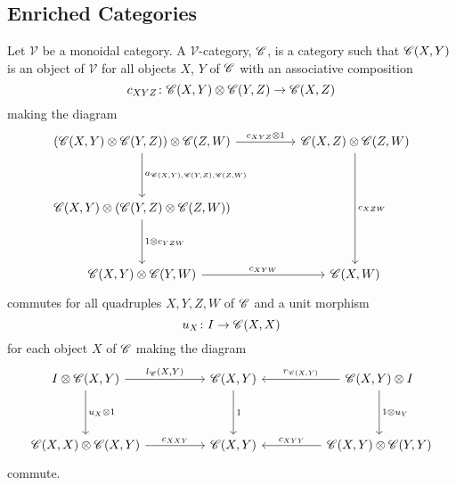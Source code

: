 \documentclass[dissertation.tex]{subfiles}
\begin{document}
\subsection{Enriched Categories}
\begin{defn}
  Let $\mathscr{V}$ be a monoidal category.
  A $\mathscr{V}$-category, $\mathscr{C}$, is a category such that $\mathscr{C}(X,Y)$ is an object of $\mathscr{V}$ for all objects $X$, $Y$ of $\mathscr{C}$ with an associative composition 
  $$c_{XYZ} \colon \mathscr{C}(X,Y) \otimes \mathscr{C}(Y,Z) \to \mathscr{C}(X,Z)$$
  making the diagram
  $$\begin{tikzcd}
    \left(\CC(X,Y) \otimes \CC(Y,Z)\right) \otimes \CC(Z,W)\arrow{rr}{c_{XYZ} \otimes 1}\arrow{dd}{a_{\CC(X,Y),\CC(Y,Z),\CC(Z,W)}} && \CC(X,Z) \otimes \CC(Z,W)\arrow{dddd}{c_{XZW}}\\
    \\
    \CC(X,Y) \otimes \left(\CC(Y,Z) \otimes \CC(Z,W)\right)\arrow{dd}{1 \otimes c_{YZW}}\\
    \\
    \CC(X,Y) \otimes \CC(Y,W)\arrow{rr}{c_{XYW}} && \CC(X,W)
  \end{tikzcd}$$
  commutes for all quadruples $X,Y,Z,W$ of $\mathscr{C}$
  and a unit morphism
  $$u_X \colon I \to \mathscr{C}(X,X)$$
  for each object $X$ of $\mathscr{C}$ making the diagram 
  $$\begin{tikzcd}
    I \otimes \CC(X,Y) \arrow{rr}{l_\CC(X,Y)}\arrow{dd}{u_X \otimes 1} && \CC(X,Y) \arrow{dd}{1}&& \CC(X,Y) \otimes I \arrow[swap]{ll}{r_{\CC(X,Y)}}\arrow{dd}{1 \otimes u_Y}\\
    \\
    \CC(X,X) \otimes \CC(X,Y) \arrow{rr}{c_{XXY}} && \CC(X,Y) && \CC(X,Y) \otimes \CC(Y,Y)\arrow[swap]{ll}{c_{XYY}}
  \end{tikzcd}$$
  commute.
\end{defn}
\end{document}
